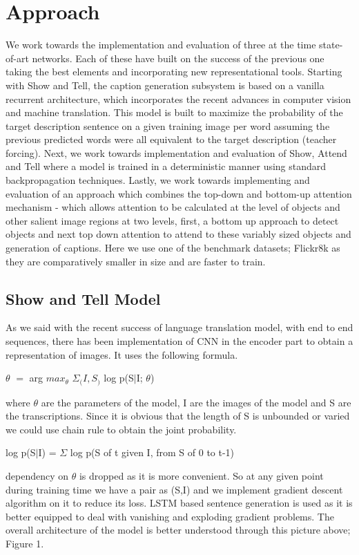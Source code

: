 \documentclass[a4paper]{article}
\begin{document}
\section{Approach}
We work towards the implementation and evaluation of three at the time state-of-art networks. Each of these have built on the success of the previous one taking the best elements and incorporating new representational tools. Starting with Show and Tell, the caption generation subsystem is based on a vanilla recurrent architecture, which incorporates the recent advances in computer vision and machine translation. This model is built to maximize the probability of the target description sentence on a given training image per word assuming the previous predicted words were all equivalent to the target description (teacher forcing).\cite{DBLP:journals/corr/VinyalsTBE14} Next, we work towards implementation and evaluation of Show, Attend and Tell where a model is trained in a deterministic manner using standard backpropagation techniques.\cite{DBLP:journals/corr/XuBKCCSZB15} Lastly, we work towards implementing and evaluation of an approach which combines the top-down and bottom-up attention mechanism - which allows attention to be calculated at the level of objects and other salient image regions at two levels, first, a bottom up approach to detect objects and next top down attention to attend to these variably sized objects and generation of captions. \cite{DBLP:journals/corr/AndersonHBTJGZ17} Here we use one of the benchmark datasets; Flickr8k as they are comparatively smaller in size and are faster to train. 
\subsection{Show and Tell Model}
As we said with the recent success of language translation model, with end to end sequences, there has been implementation of CNN in the encoder part to obtain a representation of images. It uses the following formula.\par
\begin{center}
$\theta$ $=$ arg $max_\theta$ $\Sigma_(I,S_)$ log p(S$|$I; $\theta$)
\end{center} \par \cite{DBLP:journals/corr/VinyalsTBE14}
where $\theta$ are the parameters of the model, I are the images of the model and S are the transcriptions. Since it is obvious that the length of S is unbounded or varied we could use chain rule to obtain the joint probability. \par
\begin{center}log p(S$|$I) = $\Sigma$ log p(S of t given I, from S of 0 to t-1)\end{center}
dependency on $\theta$ is dropped as it is more convenient. So at any given point during training time we have a pair as (S,I) and we implement gradient descent algorithm on it to reduce its loss. LSTM based sentence generation is used as it is better equipped to deal with vanishing and exploding gradient problems. The overall architecture of the model is better understood through this picture above; Figure 1. \cite{DBLP:journals/corr/VinyalsTBE14}
\end{document}
